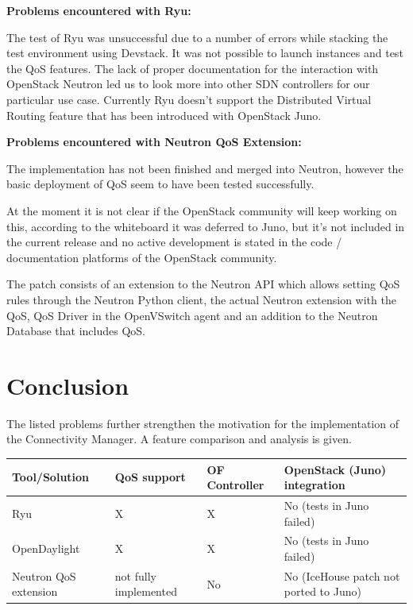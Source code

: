 \textbf{Problems encountered with Ryu:}

The test of Ryu was unsuccessful due to a number of errors while stacking the test environment using Devstack. It was not possible to launch instances and test the QoS features. The lack of proper documentation for the interaction with OpenStack Neutron led us to look more into other SDN controllers for our particular use case. Currently Ryu doesn't support the Distributed Virtual Routing feature that has been introduced with OpenStack Juno.


\textbf{Problems encountered with Neutron QoS Extension:}

The implementation has not been finished and merged into Neutron, however the basic deployment of QoS seem to have been tested successfully. 

At the moment it is not clear if the OpenStack community will keep working on this, according to the whiteboard it was deferred to Juno, but it's not included in the current release and no active development is stated in the code / documentation platforms of the OpenStack community.

The patch consists of an extension to the Neutron API which allows setting QoS rules through the Neutron Python client, the actual Neutron extension with the QoS, QoS Driver in the OpenVSwitch agent and an addition to the Neutron Database that includes QoS.

\section{Conclusion}

The listed problems further strengthen the motivation for the implementation of the Connectivity Manager. A feature comparison and analysis is given.

\begin{tabularx}{\textwidth}{ |X|X|X|X| }
\hline Tool/Solution & QoS support & OF Controller & OpenStack (Juno) integration \\ 
\hline Ryu & X & X & No (tests in Juno failed) \\ 
\hline OpenDaylight & X & X & No (tests in Juno failed) \\ 
\hline Neutron QoS extension & not fully implemented & No & No (IceHouse patch not ported to Juno) \\ 
\hline 
\end{tabularx}
